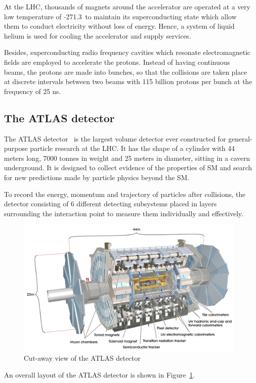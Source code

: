 \documentclass[UTF8,12pt]{ctexart}
\numberwithin{equation}{section}
\begin{document}
 At the LHC, thousands of magnets around the accelerator are operated at a very low temperature of ‑271.3\textcelsius \ to maintain its superconducting state which allow them to conduct electricity without loss of energy. Hence, a system of liquid helium is used for cooling the accelerator and supply services.

Besides, superconducting radio frequency cavities which resonate electromagnetic fields are employed to accelerate the protons. Instead of having continuous beams, the protons are made into bunches, so that the collisions are taken place at discrete intervals between two beams with 115 billion protons per bunch at the frequency of 25 ns.


\subsection{The ATLAS detector}
\label{sec:3.2}

The ATLAS detector~\cite{PERF-2007-01} is the largest volume detector ever constructed for general-purpose particle research at the LHC. It has the shape of a cylinder with 44 meters long, 7000 tonnes in weight and 25 meters in diameter, sitting in a cavern underground. It is designed to collect evidence of the properties of SM and search for new predictions made by particle physics beyond the SM.

To record the energy, momentum and trajectory of particles after collisions, the detector consisting of 6 different detecting subsystems  placed in layers surrounding the interaction point to measure them individually and effectively. 

 \begin{figure}[htb] 
	\centering  
	\includegraphics[width=15cm]{./fig/atlas.png}
	\caption{Cut-away view of the ATLAS detector}
	\label{Fig.atlas}
\end{figure}
An overall layout of the ATLAS detector is shown in Figure~\ref{Fig.atlas}.
\end{document}
